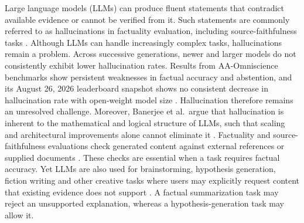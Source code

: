 \documentclass{clv2025}
\begin{document}
Large language models (LLMs) can produce fluent statements that contradict
available evidence or cannot be verified from it. 
Such statements are commonly referred to as hallucinations in factuality evaluation, including source-faithfulness tasks \citep{ji_survey_2023,huang_survey_2025}.
Although LLMs can handle increasingly complex tasks, hallucinations remain a problem.
Across successive generations, newer and larger models do not
consistently exhibit lower hallucination rates. Results from AA-Omniscience benchmarks show
persistent weaknesses in factual accuracy and abstention, and its August 26,
2026 leaderboard snapshot shows no consistent decrease in hallucination rate
with open-weight model size
\citep{jackson_aaomniscience_2025,artificialanalysis_omniscience_leaderboard_2026}.
Hallucination therefore remains an unresolved challenge. Moreover, Banerjee
et al.\ argue that hallucination is inherent to the mathematical and logical
structure of LLMs, such that scaling and architectural improvements alone
cannot eliminate it \citep{banerjee_llms_2024}.
Factuality and source-faithfulness evaluations check generated content against external references or supplied documents \citep{maynez_faithfulness_2020,kryscinski_evaluating_2020,min_factscore_2023}.
These checks are essential when a task requires factual accuracy.
Yet LLMs are also used for brainstorming, hypothesis generation,  fiction writing and other creative tasks
where users may explicitly request content that existing evidence does not
support \citep{franceschelli_creativity_2024,jiang_survey_2024}.
A factual summarization task may reject an unsupported explanation, whereas a hypothesis-generation task may allow it.
\end{document}
